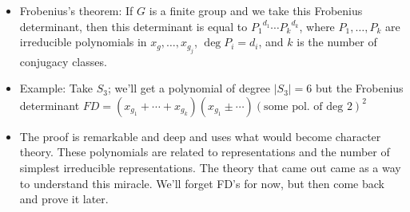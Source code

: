 \documentclass[../notes.tex]{subfiles}
\begin{document}
\begin{itemize}
\begin{itemize}
\begin{itemize}
        \end{itemize}
        \item Frobenius's theorem: If $G$ is a finite group and we take this Frobenius determinant, then this determinant is equal to ${P_1}^{d_1}\cdots{P_k}^{d_k}$, where $P_1,\dots,P_k$ are irreducible polynomials in $x_g,\dots,x_{g_j}$, $\deg P_i=d_i$, and $k$ is the number of conjugacy classes.
        \item Example: Take $S_3$; we'll get a polynomial of degree $|S_3|=6$ but the Frobenius determinant $FD=(x_{g_1}+\cdots+x_{g_k})(x_{g_1}\pm\cdots)(\text{some pol. of deg 2})^2$
        \item The proof is remarkable and deep and uses what would become character theory. These polynomials are related to representations and the number of simplest irreducible representations. The theory that came out came as a way to understand this miracle. We'll forget FD's for now, but then come back and prove it later.
    \end{itemize}
\end{itemize}
\end{document}
